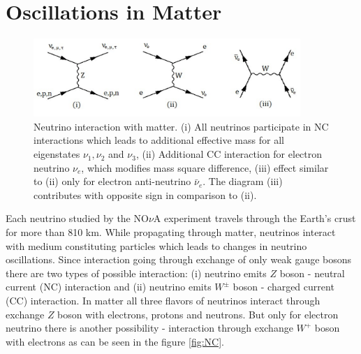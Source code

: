 \section{Oscillations in Matter}
\begin{figure}
\includegraphics[width=0.9\textwidth]{figures/NC_and_CC_currents.pdf}
\centering
\caption{Neutrino interaction with matter. (i) All neutrinos participate in NC interactions which 
leads to additional effective mass for all eigenstates $\nu_1, \nu_2$ and $\nu_3$, (ii) Additional 
CC interaction for electron neutrino $\nu_e$, which modifies mass square difference, (iii) effect 
similar to (ii) only for electron anti-neutrino $\bar{\nu}_e$. The diagram (iii) contributes with 
opposite sign in comparison to (ii).} 
\end{figure}

Each neutrino studied by the NO$\nu$A experiment travels through the Earth's crust for more 
than 810 km. While propagating through matter, neutrinos interact with medium constituting 
particles which leads to changes in neutrino oscillations. Since interaction going through 
exchange of only weak gauge bosons there are two types of possible interaction: (i) neutrino 
emits $Z$ boson - neutral current (NC) interaction and (ii) neutrino emits $W^\pm$ boson - 
charged current (CC) interaction. In matter all three flavors of neutrinos interact through 
exchange $Z$ boson with electrons, protons and neutrons. But only for electron neutrino there 
is another possibility - interaction through exchange $W^+$ boson with electrons as can be 
seen in the figure \ref{fig:NC}.

